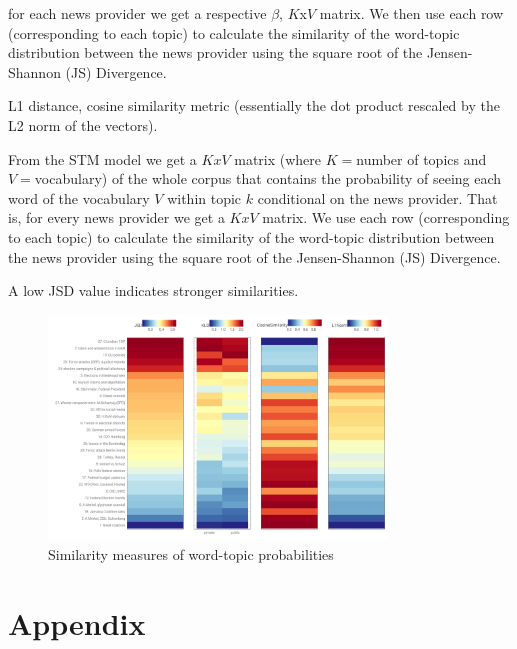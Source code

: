 \documentclass[12pt,a4paper,notitlepage]{article}
\begin{document}
for each news provider we get a respective $\beta$, $K$x$V$ matrix. We then use each row (corresponding to each topic) to calculate the similarity of the word-topic distribution between the news provider using the square root of the Jensen-Shannon (JS) Divergence.

L1 distance, cosine similarity metric (essentially the dot product rescaled by the L2 norm of the vectors).

From the STM model we get a $KxV$ matrix (where $K=$number of topics and $V=$vocabulary) of the whole corpus that contains the probability of seeing each word of the vocabulary $V$ within topic $k$ conditional on the news provider. That is, for every news provider we get a $KxV$ matrix. We use each row (corresponding to each topic) to calculate the similarity of the word-topic distribution between the news provider using the square root of the Jensen-Shannon (JS) Divergence.

A low JSD value indicates stronger similarities.

\begin{figure}[H]
	\begin{center}
		\includegraphics[width=0.8\textwidth,keepaspectratio]{../figs/distance}
		\caption{Similarity measures of word-topic probabilities}
	\end{center}
\end{figure}


\section*{Appendix}
\end{document}
